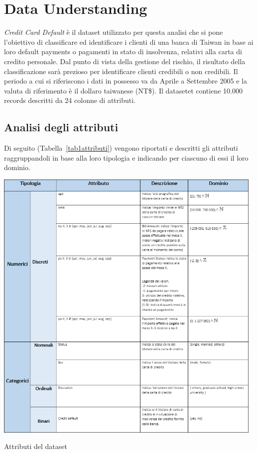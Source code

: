 \chapter{Data Understanding}

\textit{Credit Card Default} \`e il dataset utilizzato
per questa analisi che si pone l'obiettivo di classificare
ed identificare i clienti di una banca di Taiwan in base
ai loro default payments o pagamenti in stato di insolvenza,
relativi alla carta di credito personale. Dal punto di vista
della gestione del rischio, il risultato della classificazione
sar\`a prezioso per identificare clienti credibili o non credibili.
Il periodo a cui si riferiscono i dati in possesso va da Aprile
a Settembre 2005 e la valuta di riferimento \`e il dollaro
taiwanese (NT\$). Il datasetet contiene 10.000 records descritti
da 24 colonne di attributi.

\section{Analisi degli attributi}

Di seguito (Tabella~\ref{tab1attributi}) vengono riportati
e descritti gli attributi raggruppandoli in base alla loro
tipologia e indicando per ciascuno di essi il loro dominio.

\begin{table}[H]
	\centering
	\includegraphics[width=13cm]{img/tabella1-attributi.png}
	\caption[LOF entry]{Attributi del dataset}
	\label{tab1attributi}
\end{table} 

